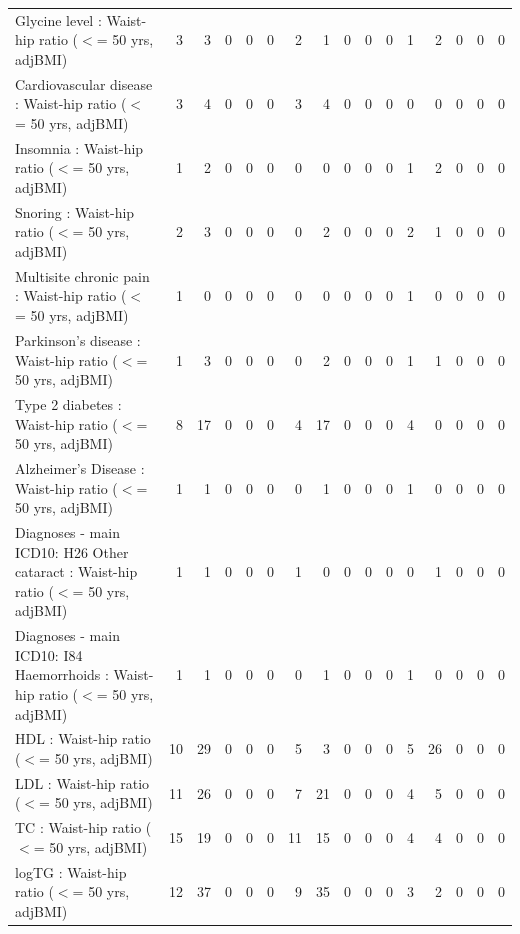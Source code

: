 \begin{table}[ht]
\begin{tabular}{lrrrrrrrrrrrrrrr}
  Glycine level  : Waist-hip ratio ($<$= 50 yrs, adjBMI) &   3 &   3 &   0 &   0 &   0 &   2 &   1 &   0 &   0 &   0 &   1 &   2 &   0 &   0 &   0 \\ 
  Cardiovascular disease : Waist-hip ratio ($<$= 50 yrs, adjBMI) &   3 &   4 &   0 &   0 &   0 &   3 &   4 &   0 &   0 &   0 &   0 &   0 &   0 &   0 &   0 \\ 
  Insomnia : Waist-hip ratio ($<$= 50 yrs, adjBMI) &   1 &   2 &   0 &   0 &   0 &   0 &   0 &   0 &   0 &   0 &   1 &   2 &   0 &   0 &   0 \\ 
  Snoring : Waist-hip ratio ($<$= 50 yrs, adjBMI) &   2 &   3 &   0 &   0 &   0 &   0 &   2 &   0 &   0 &   0 &   2 &   1 &   0 &   0 &   0 \\ 
  Multisite chronic pain : Waist-hip ratio ($<$= 50 yrs, adjBMI) &   1 &   0 &   0 &   0 &   0 &   0 &   0 &   0 &   0 &   0 &   1 &   0 &   0 &   0 &   0 \\ 
  Parkinson's disease : Waist-hip ratio ($<$= 50 yrs, adjBMI) &   1 &   3 &   0 &   0 &   0 &   0 &   2 &   0 &   0 &   0 &   1 &   1 &   0 &   0 &   0 \\ 
  Type 2 diabetes : Waist-hip ratio ($<$= 50 yrs, adjBMI) &   8 &  17 &   0 &   0 &   0 &   4 &  17 &   0 &   0 &   0 &   4 &   0 &   0 &   0 &   0 \\ 
  Alzheimer's Disease : Waist-hip ratio ($<$= 50 yrs, adjBMI) &   1 &   1 &   0 &   0 &   0 &   0 &   1 &   0 &   0 &   0 &   1 &   0 &   0 &   0 &   0 \\ 
  Diagnoses - main ICD10: H26 Other cataract : Waist-hip ratio ($<$= 50 yrs, adjBMI) &   1 &   1 &   0 &   0 &   0 &   1 &   0 &   0 &   0 &   0 &   0 &   1 &   0 &   0 &   0 \\ 
  Diagnoses - main ICD10: I84 Haemorrhoids : Waist-hip ratio ($<$= 50 yrs, adjBMI) &   1 &   1 &   0 &   0 &   0 &   0 &   1 &   0 &   0 &   0 &   1 &   0 &   0 &   0 &   0 \\ 
  HDL : Waist-hip ratio ($<$= 50 yrs, adjBMI) &  10 &  29 &   0 &   0 &   0 &   5 &   3 &   0 &   0 &   0 &   5 &  26 &   0 &   0 &   0 \\ 
  LDL : Waist-hip ratio ($<$= 50 yrs, adjBMI) &  11 &  26 &   0 &   0 &   0 &   7 &  21 &   0 &   0 &   0 &   4 &   5 &   0 &   0 &   0 \\ 
  TC : Waist-hip ratio ($<$= 50 yrs, adjBMI) &  15 &  19 &   0 &   0 &   0 &  11 &  15 &   0 &   0 &   0 &   4 &   4 &   0 &   0 &   0 \\ 
  logTG : Waist-hip ratio ($<$= 50 yrs, adjBMI) &  12 &  37 &   0 &   0 &   0 &   9 &  35 &   0 &   0 &   0 &   3 &   2 &   0 &   0 &   0 \\ 

\end{tabular}
\end{table}
